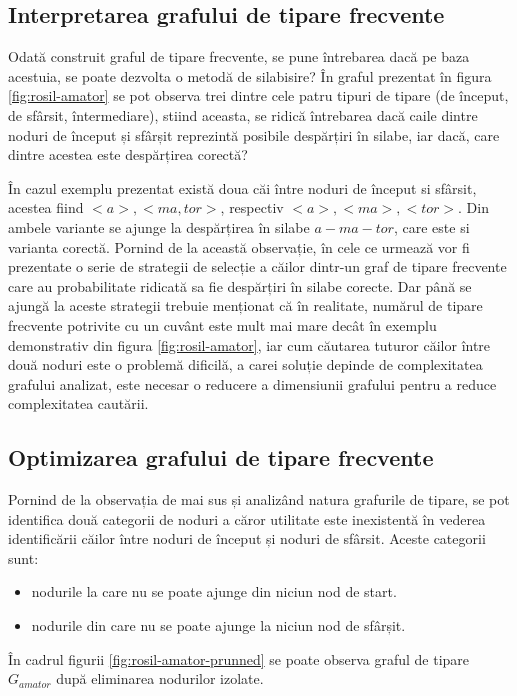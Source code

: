 \subsection{Interpretarea grafului de tipare frecvente}

Odată construit graful de tipare frecvente, se pune întrebarea dacă pe baza acestuia, se poate dezvolta o metodă de silabisire? În graful prezentat în figura \ref{fig:rosil-amator} se pot observa trei dintre cele patru tipuri de tipare (de început, de sfârsit, întermediare), stiind aceasta, se ridică întrebarea dacă caile dintre noduri de început și sfârșit reprezintă posibile despărțiri în silabe, iar dacă, care dintre acestea este despărțirea corectă?

În cazul exemplu prezentat există doua căi între noduri de început si sfârsit, acestea fiind $<a>, <ma, tor>$, respectiv $<a>, <ma>, <tor>$. Din ambele variante se ajunge la despărțirea în silabe $a-ma-tor$, care este si varianta corectă. Pornind de la această observație, în cele ce urmează vor fi prezentate o serie de strategii de selecție a căilor dintr-un graf de tipare frecvente care au probabilitate ridicată sa fie despărțiri în silabe corecte. Dar până se ajungă la aceste strategii trebuie menționat că în realitate, numărul de tipare frecvente potrivite cu un cuvânt este mult mai mare decât în exemplu demonstrativ din figura \ref{fig:rosil-amator}, iar cum căutarea tuturor căilor între două noduri este o problemă dificilă, a carei soluție depinde de complexitatea grafului analizat, este necesar o reducere a dimensiunii grafului pentru a reduce complexitatea cautării. 

\subsection{Optimizarea grafului de tipare frecvente}

Pornind de la observația de mai sus și analizând natura grafurile de tipare, se pot identifica două categorii de noduri a căror utilitate este inexistentă în vederea identificării căilor între noduri de început și noduri de sfârsit. Aceste categorii sunt:
\begin{itemize}
\item nodurile la care nu se poate ajunge din niciun nod de start.
\item nodurile din care nu se poate ajunge la niciun nod de sfârșit. 
\end{itemize}


\begin{ex}
În cadrul figurii \ref{fig:rosil-amator-prunned} se poate observa graful de tipare $G_{amator}$ după eliminarea nodurilor izolate.
\end{ex}

